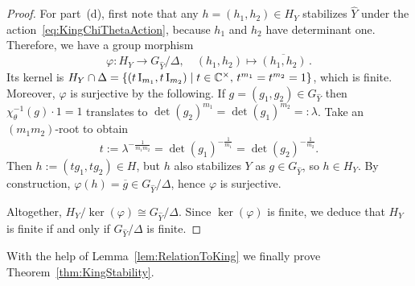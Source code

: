 \begin{proof}
	For part~(d), first note that any $h = (h_1,h_2) \in H_Y$ stabilizes $\hat{Y}$ under the action~\eqref{eq:KingChiThetaAction}, because $h_1$ and $h_2$ have determinant one. Therefore, we have a group morphism 
		\[ \varphi \colon H_Y \to G_{\hat{Y}} / \Delta , \quad (h_1, h_2) \mapsto \overline{(h_1, h_2)} \, .\]
	Its kernel is $H_Y \cap \Delta = \{ (t \operatorname{I}_{m_1}, t \operatorname{I}_{m_2}) \mid t \in \mathbb C^\times, \, t^{m_1} = t^{m_2} = 1 \}$, which is finite. Moreover, $\varphi$ is surjective by the following. If $g = (g_1,g_2) \in G_{\hat{Y}}$ then $\chi_\theta^{-1}(g) \cdot 1 = 1$ translates to $\det(g_2)^{m_1} = \det(g_1)^{m_2} =: \lambda$.
	Take an $(m_1m_2)$-root to obtain
		\[ t := \lambda^{- \frac{1}{m_1 m_2}} = \det(g_1)^{-\frac{1}{m_1}}  = \det(g_2)^{-\frac{1}{m_2}} .\]
	Then $h := (t g_1, t g_2) \in H$, but $h$ also stabilizes $Y$ as $g \in G_{\hat{Y}}$, so $h \in H_Y$. By construction, $\varphi(h) = \overline{g} \in G_{\hat{Y}} / \Delta$, hence $\varphi$ is surjective.
	
	Altogether, $H_Y / \ker(\varphi) \cong G_{\hat{Y}} / \Delta$. Since $\ker(\varphi)$ is finite, we deduce that $H_Y$ is finite if and only if $G_{\hat{Y}} / \Delta$ is finite.
\end{proof}


With the help of Lemma~\ref{lem:RelationToKing} we finally prove Theorem~\ref{thm:KingStability}.

